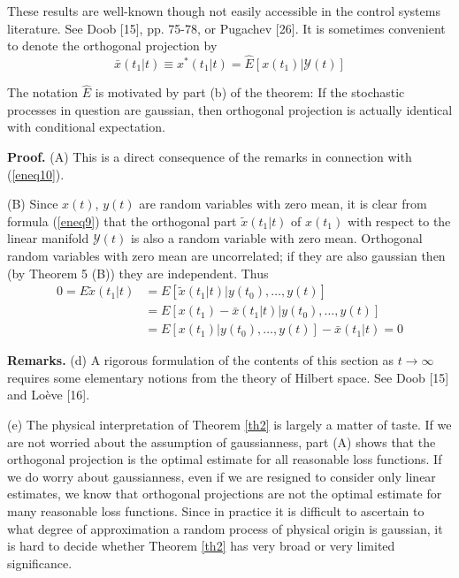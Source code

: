 \documentclass{article}
\newcommand{\manf}[1]{\mathbf{\mathcal{#1}}}
\begin{document}
These results are well-known though not easily accessible in the control systems literature. See Doob [15], pp. 75-78, or Pugachev [26]. It is sometimes convenient to denote the orthogonal projection by
\begin{equation*}
\bar{x}(t_1 \vert t) \equiv x^\ast (t_1 \vert t)=\hat{E}[x(t_1) \vert \mathbf{\mathcal{Y}}(t)]
\end{equation*}

The notation $\hat{E}$ is motivated by part (b) of the theorem: If the stochastic processes in question are gaussian, then orthogonal projection is actually identical with conditional expectation.

\textbf{Proof.} (A) This is a direct consequence of the remarks in connection
with (\ref{eneq10}).

(B) Since $x(t)$, $y(t)$ are random variables with zero mean, it is clear from formula (\ref{eneq9}) that the orthogonal part $\tilde{x}(t_1 \vert t)$ of $x(t_1)$ with respect to the linear manifold $\manf{Y}(t)$ is also a random variable with zero mean. Orthogonal random variables with zero mean are uncorrelated; if they are also gaussian then (by Theorem 5 (B)) they are independent. Thus
\begin{equation*}
\begin{split}
0=E\tilde{x}(t_1 \vert t)&=E[\tilde{x}(t_1 \vert t)\vert y(t_0),\dotsc,y(t)]\\
&=E[x(t_1) - \bar{x}(t_1 \vert t)\vert y(t_0),\dotsc,y(t)]\\
&=E[x(t_1)\vert y(t_0),\dotsc,y(t)]-\bar{x}(t_1 \vert t)=0
\end{split}
\end{equation*}

\textbf{Remarks.} (d) A rigorous formulation of the contents of this section as $t \to \infty$ requires some elementary notions from the theory of Hilbert space. See Doob [15] and Lo\`{e}ve [16].

(e) The physical interpretation of Theorem \ref{th2} is largely a matter of taste. If we are not worried about the assumption of gaussianness,
part (A) shows that the orthogonal projection is the optimal estimate for all reasonable loss functions. If we do worry about gaussianness, even if we are resigned to consider only linear estimates, we know that orthogonal projections are not the optimal estimate for many reasonable loss functions. Since in practice it is difficult to ascertain to what degree of approximation a random process of physical origin is gaussian, it is hard to decide whether Theorem \ref{th2} has very broad or very limited significance.
\end{document}
